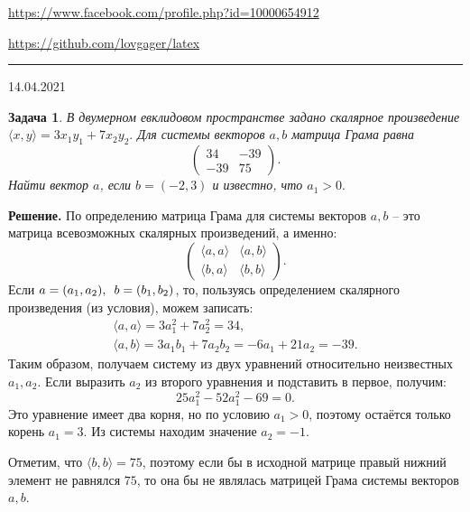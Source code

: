\documentclass[12pt]{article}
\begin{document}


\begin{flushleft}
\url{https://www.facebook.com/profile.php?id=10000654912}

\url{https://github.com/lovgager/latex}
\end{flushleft}
\hrule 
\begin{flushright}
14.04.2021
\end{flushright}
\bigskip


\newtheorem*{task}{Задача}
\begin{task}
В двумерном евклидовом пространстве задано скалярное произведение \\ $\langle x,y \rangle = 3x_1y_1+7x_2y_2.$ Для системы векторов $a,b$ матрица Грама равна 
\begin{equation*}
    \begin{pmatrix}
    34 & -39\\
    -39 & 75
    \end{pmatrix}.
\end{equation*}
Найти вектор $a$, если $b = (-2,3)$ и известно, что $a_1 > 0.$
\end{task}

\noindent\textbf{Решение.} 
По определению матрица Грама для системы векторов $a,b$ -- это матрица всевозможных скалярных произведений, а именно:
\begin{equation*}
    \begin{pmatrix}
    \langle a, a \rangle & \langle a, b \rangle \\
    \langle b, a \rangle & \langle b, b \rangle
    \end{pmatrix}.
\end{equation*}
Если $a=(a_1,a_2), \enskip b=(b_1, b_2)$, то, пользуясь определением скалярного произведения (из условия), можем записать:
\begin{gather*}
    \langle a, a \rangle = 3a_1^2+7a_2^2 = 34,\\
    \langle a, b \rangle = 3a_1b_1 + 7a_2b_2 = -6a_1+21a_2=-39.
\end{gather*}
Таким образом, получаем систему из двух уравнений относительно неизвестных $a_1, a_2$. Если выразить $a_2$ из второго уравнения и подставить в первое, получим:
\begin{equation*}
    25a_1^2-52a_1^2-69=0.
\end{equation*}
Это уравнение имеет два корня, но по условию $a_1>0$, поэтому остаётся только корень $a_1=3.$ Из системы находим значение $a_2 = -1.$ 

Отметим, что $\langle b,b\rangle=75$, поэтому если бы в исходной матрице правый нижний элемент не равнялся $75$, то она бы не являлась матрицей Грама системы векторов $a,b$.
\end{document}
